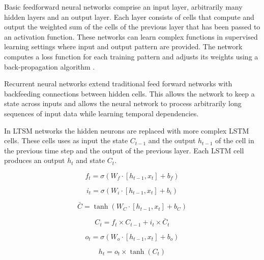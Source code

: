 Basic feedforward neural networks comprise an input layer, arbitrarily many hidden layers and an output layer.
Each layer consists of cells that compute and output the weighted sum of the cells of the previous layer that has been passed to an activation function.
These networks can learn complex functions in supervised learning settings where input and output pattern are provided.
The network computes a loss function for each training pattern and adjusts its weights using a back-propagation algorithm \cite{rumelhart1986learning}.

Recurrent neural networks extend traditional feed forward networks with backfeeding connections between hidden cells.
This allows the network to keep a state across inputs and allows the neural network to process arbitrarily long sequences of input data while learning temporal dependencies.

In LTSM networks the hidden neurons are replaced with more complex LSTM cells.
These cells uses as input the state $C_{t-1}$ and the output $h_{t-1}$ of the cell in the previous time step and the output of the previous layer.
Each LSTM cell produces an output $h_t$ and state $C_t$.


\begin{equation}\label{key}
	f_t = \sigma(W_f \cdot [h_{t-1}, x_t] + b_f)
\end{equation}

\begin{equation}\label{key}
	i_t = \sigma (W_i \cdot [h_{t-1}, x_t] + b_i)
\end{equation}

\begin{equation}\label{key}
	\bar{C} = \tanh (W_C \cdot [h_{t-1}, x_t] + b_C)
\end{equation}

\begin{equation}\label{key}
	C_t = f_t \times C_{t-1} + i_t \times \bar{C}_t
\end{equation}

\begin{equation}\label{key}
	o_t = \sigma (W_o \cdot [h_{t-1}, x_t] + b_o)
\end{equation}

\begin{equation}\label{key}
	h_t = o_t \times \tanh(C_t )
\end{equation}



